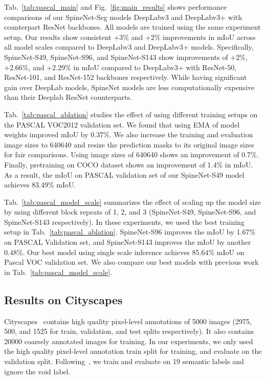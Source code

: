 \documentclass[10pt,twocolumn,letterpaper]{article}
\begin{document}
Tab.~\ref{tab:pascal_main} and Fig.~\ref{fig:main_results} shows performance comparisons of our SpineNet-Seg models \vs DeepLabv3 and DeepLabv3+ with counterpart ResNet backbones. All models are trained using the same experiment setup. Our results show consistent +3\% and +2\% improvements in mIoU across all model scales compared to DeepLabv3 and DeepLabv3+ models. Specifically, SpineNet-S49, SpineNet-S96, and SpineNet-S143 show improvements of +2\%, +2.66\%, and +2.29\% in mIoU compared to DeepLabv3+ with ResNet-50, ResNet-101, and ResNet-152 backbones respectively. While having significant gain over DeepLab models, SpineNet models are less computationally expensive than their Deeplab ResNet counterparts.


Tab.~\ref{tab:pascal_ablation} studies the effect of using different training setups on the PASCAL VOC2012 validation set. We found that using EMA of model weights improved mIoU by 0.37\%. We also increase the training and evaluation image sizes to 640640 and resize the prediction masks to its original image sizes for fair comparisons. Using image sizes of 640640 shows an improvement of 0.7\%. Finally, pretraining on COCO dataset shows an improvement of 1.4\% in mIoU. As a result, the mIoU on PASCAL validation set of our SpineNet-S49 model achieves 83.49\% mIoU.

Tab.~\ref{tab:pascal_model_scale} summarizes the effect of scaling up the model size by using different block repeats of 1, 2, and 3 (SpineNet-S49, SpineNet-S96, and SpineNet-S143 respectively). In these experiments, we used the best training setup in Tab.~\ref{tab:pascal_ablation}. SpineNet-S96 improves the mIoU by 1.67\% on PASCAL Validation set, and SpineNet-S143 improves the mIoU by another 0.48\%. Our best model using single scale inference achieves 85.64\% mIoU on Pascal VOC validation set. We also compare our best models with previous work in Tab.~\ref{tab:pascal_model_scale}.


\subsection{Results on Cityscapes}
Cityscapes~\cite{Cordts2016Cityscapes} contains high quality pixel-level annotations of 5000 images (2975, 500, and 1525 for train, validation, and test splits respectively). It also contains 20000 coarsely annotated images for training. In our experiments, we only used the high quality pixel-level annotation train split for training, and evaluate on the validation split. Following~\cite{Cordts2016Cityscapes}, we train and evaluate on 19 semantic labels and ignore the void label.
\end{document}
